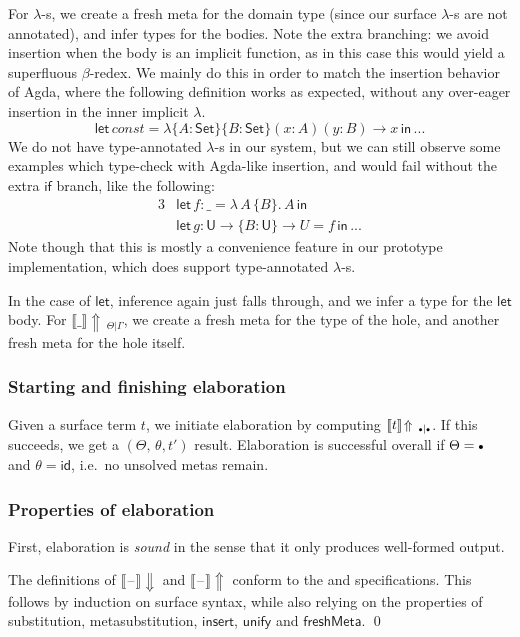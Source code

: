 \documentclass[acmsmall,review,anonymous,prologue,dvipsnames]{acmart}\settopmatter{printfolios=true,printccs=false,printacmref=false}
\newcommand{\slet}{\boldsymbol{\mathsf{let}}}
\renewcommand{\sin}{\boldsymbol{\mathsf{in}}}
\renewcommand{\U}{\mathsf{U}}
\newcommand{\emptycon}{\scaleobj{.75}\bullet}
\newcommand{\id}{\mathsf{id}}
\newcommand{\blank}{\mathord{\hspace{1pt}\text{--}\hspace{1pt}}}
\newcommand{\unify}{\mathsf{unify}}
\newcommand{\mi}[1]{\mathit{#1}}
\newcommand{\echeckblank}{\llbracket\blank\rrbracket\!\Downarrow}
\newcommand{\einferblank}{\llbracket\blank\rrbracket\!\Uparrow}
\newcommand{\einfer}[3]{\llbracket#1\rrbracket\!\Uparrow\,_{#2|#3}}
\newcommand{\eif}{\boldsymbol{\mathsf{if}}}
\newcommand{\Set}{\mathsf{Set}}
\theoremstyle{remark}
\begin{document}
For $\lambda$-s, we create a fresh meta for the domain type (since our surface
$\lambda$-s are not annotated), and infer types for the bodies. Note the extra
branching: we avoid insertion when the body is an implicit function, as in this
case this would yield a superfluous $\beta$-redex. We mainly do this in order to
match the insertion behavior of Agda, where the following definition works as
expected, without any over-eager insertion in the inner implicit $\lambda$.
\[
  \slet\,\mi{const} = \lambda\{A : \Set\}\{B : \Set\}(x : A)(y : B) \to x\,\sin\,...
\]
We do not have type-annotated $\lambda$-s in our system, but we can still
observe some examples which type-check with Agda-like insertion, and would fail
without the extra $\eif$ branch, like the following:
\begin{alignat*}{3}
  & \slet\,f : \_ = \lambda\,A\,\{B\}.\,A\,\sin\,\\
  & \slet\,g : \U \to \{B : \U\}\to U = f\,\sin\,...
\end{alignat*}
Note though that this is mostly a convenience feature in our prototype implementation,
which does support type-annotated $\lambda$-s.

In the case of $\slet$, inference again just falls through, and we infer a type
for the $\slet$ body. For $\einfer{\_}{\Theta}{\Gamma}$, we create a fresh meta
for the type of the hole, and another fresh meta for the hole itself.

\subsubsection{Starting and finishing elaboration} Given a surface term $t$,
we initiate elaboration by computing $\einfer{t}{\emptycon}{\emptycon}$. If this
succeeds, we get a $(\Theta,\,\theta,t')$ result. Elaboration is successful overall
if $\Theta = \emptycon$ and $\theta = \id$, i.e.\ no unsolved metas remain.

\subsubsection{Properties of elaboration}
First, elaboration is \emph{sound} in the sense that it only produces well-formed
output.

\begin{theorem}[Soundness] The definitions of $\echeckblank$ and
$\einferblank$ conform to the  and 
  specifications. This follows by induction on surface syntax, while also
  relying on the properties of substitution, metasubstitution,
  $\mathsf{insert}$, $\unify$ and $\mathsf{freshMeta}$. \qed
\end{theorem}
\end{document}
